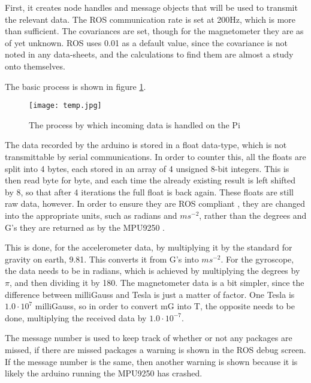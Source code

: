 First, it creates node handles and message objects that will be used to transmit the relevant data.
The ROS communication rate is set at 200Hz, which is more than sufficient.
The covariances are set, though for the magnetometer they are as of yet unknown.
ROS uses 0.01 as a default value, since the covariance is not noted in any data-sheets, and the calculations to find them are almost a study onto themselves.

The basic process is shown in figure \ref{fig::piDataReception}.

\begin{figure}[H]
\centering
\texttt{[image: temp.jpg]}
\caption{The process by which incoming data is handled on the Pi}
\label{fig::piDataReception}
\end{figure}

The data recorded by the arduino is stored in a float data-type, which is not transmittable by serial communications.
In order to counter this, all the floats are split into 4 bytes, each stored in an array of 4 unsigned 8-bit integers.
This is then read byte for byte, and each time the already existing result is left shifted by 8, so that after 4 iterations the full float is back again.
These floats are still raw data, however.
In order to ensure they are ROS compliant \cite{ROSformat}, they are changed into the appropriate units, such as radians and $ms^{-2}$, rather than the degrees and G's they are returned as by the MPU9250 \cite{MPU9250}.

This is done, for the accelerometer data, by multiplying it by the standard for gravity on earth, 9.81.
This converts it from G's into $ms^{-2}$.
For the gyroscope, the data needs to be in radians, which is achieved by multiplying the degrees by $\pi$, and then dividing it by 180.
The magnetometer data is a bit simpler, since the difference between milliGauss and Tesla is just a matter of factor.
One Tesla is $1.0 \cdot 10^{7}$ milliGauss, so in order to convert mG into T, the opposite needs to be done, multiplying the received data by  $1.0 \cdot 10^{-7}$.

The message number is used to keep track of whether or not any packages are missed, if there are missed packages a warning is shown in the ROS debug screen.
If the message number is the same, then another warning is shown because it is likely the arduino running the MPU9250 has crashed.


\newpage